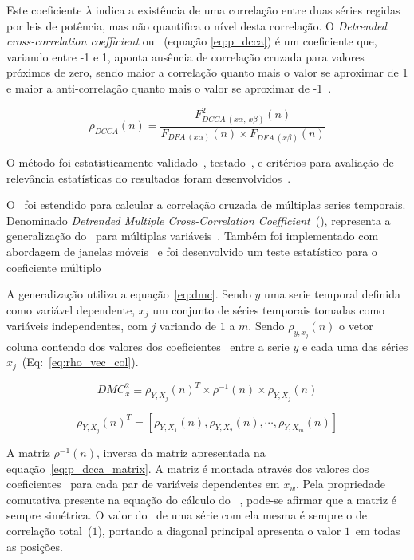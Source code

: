 Este coeficiente \(\lambda\) indica a existência de uma correlação entre duas séries regidas por leis de potência, mas não quantifica o nível desta correlação. O \emph{Detrended cross-correlation coefficient} ou \pdcca~(equação \ref{eq:p_dcca}) é um coeficiente que, variando entre -1 e 1, aponta ausência de correlação cruzada para valores próximos de zero, sendo maior a correlação quanto mais o valor se aproximar de 1 e maior a anti-correlação quanto mais o valor se aproximar de -1~\cite{Zebende2011}.


\begin{equation}
  {\rho}_{DCCA}(n) = \frac{F_{DCCA~(x\alpha,~x\beta)}^{2}(n)}
  {F_{DFA~(x\alpha)}(n) \times F_{DFA~(x\beta)}(n)}
  \label{eq:p_dcca}
\end{equation}

O método foi estatisticamente validado~\cite{PhysRevE.84.066118}, testado~\cite{vassolerZebende2012, Guedes2017, Ferreira2018},
e critérios para avaliação de relevância estatísticas do resultados foram desenvolvidos~\cite{Guedes2018,Guedes2018a}.

O \pdcca~foi estendido para calcular a correlação cruzada de múltiplas series temporais. Denominado \emph{Detrended Multiple Cross-Correlation Coefficient}~(\dmc), representa a generalização do \pdcca~para múltiplas variáveis~\cite{Zebende2018}. Também foi implementado com abordagem de janelas móveis~\cite{Guedes2021} e foi desenvolvido um teste estatístico para o coeficiente múltiplo~\cite{DaSilvaFilho2021}

A generalização utiliza a equação~\ref{eq:dmc}. Sendo $y$ uma serie temporal definida como variável dependente, $x_{j}$ um conjunto de séries temporais tomadas como variáveis independentes, com $j$ variando de $1$ a $m$. Sendo $\rho_{y,x_{j}}(n)$ o vetor coluna contendo dos valores dos coeficientes \pdcca~entre a serie $y$ e cada uma das séries $x_{j}$~(Eq:~\ref{eq:rho_vec_col}). 

\begin{equation}
  {DMC}_{x}^{2}  \equiv \rho_{Y,X_{j}}(n)^{T} \times \rho^{-1}(n) \times \rho_{Y,X_{j}}(n)
  \label{eq:dmc}
\end{equation}

\begin{equation} \label{eq:rho_vec_col}
  \rho_{Y,X_{j}}(n)^T=[\rho_{Y,X_1}(n), \rho_{Y,X_2}(n),\cdots,\rho_{Y,X_m}(n)]
\end{equation}


A matriz  $\rho^{-1}(n)$, inversa da matriz apresentada na equação~\ref{eq:p_dcca_matrix}. A matriz é montada através dos valores dos coeficientes \pdcca~para cada par de variáveis dependentes em $x_{w}$. Pela propriedade comutativa presente na equação do cálculo do \pdcca~, pode-se afirmar que a matriz é sempre simétrica. O valor do \pdcca~de uma série com ela mesma é sempre o de correlação total~($1$), portando a diagonal principal apresenta o valor $1$~em todas as posições.

